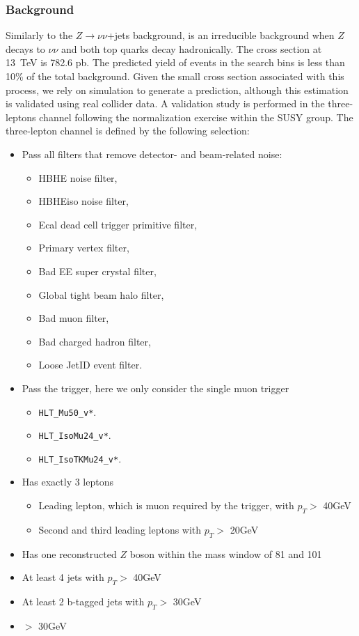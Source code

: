 \subsubsection{\texorpdfstring{\ttbarZ Background}{\ttbarZ Background}}
\label{sss:ttZ}

Similarly to the $Z\rightarrow\nu\nu$+jets background, \ttbarZ is an
irreducible background when $Z$ decays to $\nu \nu$ and both top quarks decay
hadronically.  The \ttbarZ cross section at 13~TeV is 782.6 pb. The predicted
yield of \ttbarZ events in the search bins is less than 10\% of the total
background. Given the small cross section associated with this process, we
rely on simulation to generate a prediction, although this estimation is
validated using real collider data. A validation study is performed in the
three-leptons channel following the \ttbarZ normalization exercise within the
SUSY group. The three-lepton channel is defined by the following selection:

\begin{itemize}
  \item Pass all filters that remove detector- and beam-related noise: 
    \begin{itemize}
      \item HBHE noise filter, 
      \item HBHEiso noise filter, 
      \item Ecal dead cell trigger primitive filter,
      \item Primary vertex filter,
      \item Bad EE super crystal filter,
      \item Global tight beam halo filter,
      \item Bad muon filter,
      \item Bad charged hadron filter,
      \item Loose JetID event filter.
    \end{itemize}
  \item Pass the trigger, here we only consider the single muon trigger
    \begin{itemize}
      \item \texttt{HLT\_Mu50\_v*}.
      \item \texttt{HLT\_IsoMu24\_v*}.
      \item \texttt{HLT\_IsoTKMu24\_v*}.
    \end{itemize}
  \item Has exactly 3 leptons
    \begin{itemize}
			\item Leading lepton, which is muon required by the trigger, with $p_{T}>$ 40GeV
			\item Second and third leading leptons with $p_{T}>$ 20GeV
    \end{itemize}
  \item Has one reconstructed $Z$ boson within the mass window of 81 and 101
	\item At least 4 jets with $p_{T}>$ 40GeV
	\item At least 2 b-tagged jets with $p_{T}>$ 30GeV
  \item \MET $>$ 30GeV
\end{itemize}

